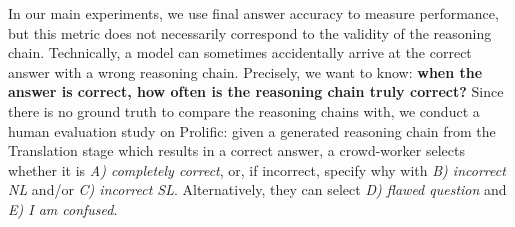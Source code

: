 




In our main experiments, we use final answer accuracy to measure performance, but this metric does not necessarily correspond to the validity of the reasoning chain. Technically, a model can sometimes accidentally arrive at the correct answer with a wrong reasoning chain.
Precisely, we want to know: \textbf{when the answer is correct, how often is the reasoning chain truly correct?} Since there is no ground truth to compare the reasoning chains with, we conduct a human evaluation study on Prolific: given a generated reasoning chain from the Translation stage which results in a correct answer, a crowd-worker selects whether it is \textit{A) completely correct}, or, if incorrect, specify why with \textit{B) incorrect NL} and/or \textit{C) incorrect SL}. Alternatively, they can select \textit{D) flawed question} and \textit{E) I am confused}. 

